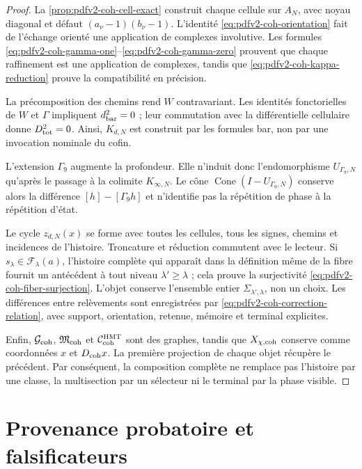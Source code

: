 \begin{proof}
La \cref{prop:pdfv2-coh-cell-exact} construit chaque cellule sur \(A_N\), avec
noyau diagonal et défaut \((a_\nu-1)(b_\nu-1)\). L'identité
\eqref{eq:pdfv2-coh-orientation} fait de l'échange orienté une application de
complexes involutive. Les formules
\eqref{eq:pdfv2-coh-gamma-one}--\eqref{eq:pdfv2-coh-gamma-zero} prouvent que
chaque raffinement est une application de complexes, tandis que
\eqref{eq:pdfv2-coh-kappa-reduction} prouve la compatibilité en précision.

La précomposition des chemins rend \(W\) contravariant. Les identités
fonctorielles de \(W\) et \(\Gamma\) impliquent
\(d_{\rm bar}^2=0\) ; leur commutation avec la différentielle cellulaire donne
\(D_{\rm tot}^2=0\). Ainsi, \(K_{d,N}\) est construit par les formules bar,
non par une invocation nominale du cofin.

L'extension \(\Gamma_9\) augmente la profondeur. Elle n'induit donc
l'endomorphisme \(U_{\Gamma_9,N}\) qu'après le passage à la colimite
\(K_{\infty,N}\). Le cône
\(\operatorname{Cone}(I-U_{\Gamma_9,N})\) conserve alors la différence
\([h]-[\Gamma_9h]\) et n'identifie pas la répétition de phase à la répétition
d'état.

Le cycle \(z_{d,N}(x)\) se forme avec toutes les cellules, tous les signes, chemins et
incidences de l'histoire. Troncature et réduction commutent avec le lecteur. Si
\(s_\lambda\in\mathscr F_\lambda(a)\), l'histoire complète qui apparaît dans
la définition même de la fibre fournit un antécédent à tout niveau
\(\lambda'\geq\lambda\) ; cela prouve la surjectivité
\eqref{eq:pdfv2-coh-fiber-surjection}. L'objet conserve l'ensemble entier
\(\Sigma_{\lambda',\lambda}\), non un choix. Les différences entre
relèvements sont enregistrées par
\eqref{eq:pdfv2-coh-correction-relation}, avec support, orientation, retenue,
mémoire et terminal explicites.

Enfin, \(\mathcal G_{\rm coh}\), \(\mathfrak M_{\rm coh}\) et
\(\mathcal C_{\rm coh}^{\rm HMT}\) sont des graphes, tandis que
\(X_{\chi,{\rm coh}}\) conserve comme coordonnées \(x\) et \(D_{\rm coh}x\).
La première projection de chaque objet récupère le précédent. Par conséquent, la
composition complète ne remplace pas l'histoire par une classe, la multisection par un
sélecteur ni le terminal par la phase visible.
\end{proof}

\section{Provenance probatoire et falsificateurs}
\label{sec:pdfv2-coh-provenance-falsifiers}

